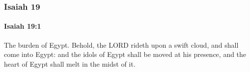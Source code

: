	\subsubsection{Isaiah 19} %
		\label{ISAIAH-19}

		\paragraph{Isaiah 19:1} %
			\label{ISAIAH-19-1}

			The burden of Egypt. Behold, the LORD rideth upon a swift cloud, and shall come into Egypt: and the idols of Egypt shall be moved at his presence, and the heart of Egypt shall melt in the midst of it.


